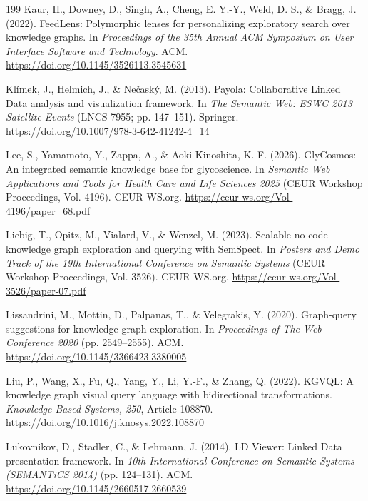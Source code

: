 \documentclass[manuscript,review,screen]{acmart}
\begin{document}
\begin{thebibliography}{199}
 Kaur, H., Downey, D., Singh, A., Cheng, E. Y.-Y., Weld, D. S., \& Bragg, J. (2022). FeedLens: Polymorphic lenses for personalizing exploratory search over knowledge graphs. In \textit{Proceedings of the 35th Annual ACM Symposium on User Interface Software and Technology}. ACM. \url{https://doi.org/10.1145/3526113.3545631}

 Kl\'{i}mek, J., Helmich, J., \& Ne\v{c}ask\'{y}, M. (2013). Payola: Collaborative Linked Data analysis and visualization framework. In \textit{The Semantic Web: ESWC 2013 Satellite Events} (LNCS 7955; pp. 147--151). Springer. \url{https://doi.org/10.1007/978-3-642-41242-4_14}

 Lee, S., Yamamoto, Y., Zappa, A., \& Aoki-Kinoshita, K. F. (2026). GlyCosmos: An integrated semantic knowledge base for glycoscience. In \textit{Semantic Web Applications and Tools for Health Care and Life Sciences 2025} (CEUR Workshop Proceedings, Vol. 4196). CEUR-WS.org. \url{https://ceur-ws.org/Vol-4196/paper_68.pdf}

 Liebig, T., Opitz, M., Vialard, V., \& Wenzel, M. (2023). Scalable no-code knowledge graph exploration and querying with SemSpect. In \textit{Posters and Demo Track of the 19th International Conference on Semantic Systems} (CEUR Workshop Proceedings, Vol. 3526). CEUR-WS.org. \url{https://ceur-ws.org/Vol-3526/paper-07.pdf}

 Lissandrini, M., Mottin, D., Palpanas, T., \& Velegrakis, Y. (2020). Graph-query suggestions for knowledge graph exploration. In \textit{Proceedings of The Web Conference 2020} (pp. 2549--2555). ACM. \url{https://doi.org/10.1145/3366423.3380005}

 Liu, P., Wang, X., Fu, Q., Yang, Y., Li, Y.-F., \& Zhang, Q. (2022). KGVQL: A knowledge graph visual query language with bidirectional transformations. \textit{Knowledge-Based Systems, 250}, Article 108870. \url{https://doi.org/10.1016/j.knosys.2022.108870}

 Lukovnikov, D., Stadler, C., \& Lehmann, J. (2014). LD Viewer: Linked Data presentation framework. In \textit{10th International Conference on Semantic Systems (SEMANTiCS 2014)} (pp. 124--131). ACM. \url{https://doi.org/10.1145/2660517.2660539}


\end{thebibliography}
\end{document}
